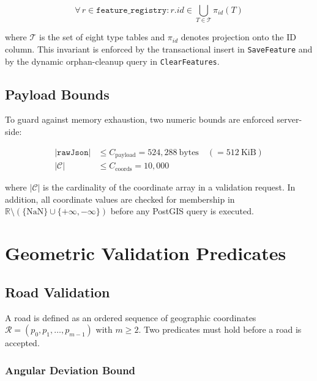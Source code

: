 \documentclass[12pt,a4paper]{article}
\theoremstyle{definition}
\theoremstyle{plain}
\theoremstyle{remark}
\newcommand{\R}{\mathbb{R}}
\newcommand{\abs}[1]{\left\lvert #1 \right\rvert}
\begin{document}
\begin{equation}
  \forall\, r \in \texttt{feature\_registry}: r.\mathit{id} \in
  \bigcup_{T \in \mathcal{T}} \pi_{\mathit{id}}(T)
  \label{eq:registry_invariant}
\end{equation}

where $\mathcal{T}$ is the set of eight type tables and $\pi_{\mathit{id}}$
denotes projection onto the ID column. This invariant is enforced by the
transactional insert in \texttt{SaveFeature} and by the dynamic
orphan-cleanup query in \texttt{ClearFeatures}.

\subsection{Payload Bounds}

To guard against memory exhaustion, two numeric bounds are enforced
server-side:

\begin{align}
  \abs{\texttt{rawJson}} &\leq C_{\text{payload}} = 524{,}288\ \text{bytes} \quad
  (= 512\ \text{KiB})
  \label{eq:payload_bound} \\
  \abs{\mathcal{C}} &\leq C_{\text{coords}} = 10{,}000
  \label{eq:coord_bound}
\end{align}

where $\abs{\mathcal{C}}$ is the cardinality of the coordinate array in a
validation request. In addition, all coordinate values are checked for
membership in $\R \setminus (\{\mathrm{NaN}\} \cup \{+\infty, -\infty\})$
before any PostGIS query is executed.

\section{Geometric Validation Predicates}
\label{sec:validation}

\subsection{Road Validation}
\label{sec:road_validation}

A road is defined as an ordered sequence of geographic coordinates
$\mathcal{R} = (p_0, p_1, \ldots, p_{m-1})$ with $m \geq 2$.
Two predicates must hold before a road is accepted.

\subsubsection{Angular Deviation Bound}
\end{document}
